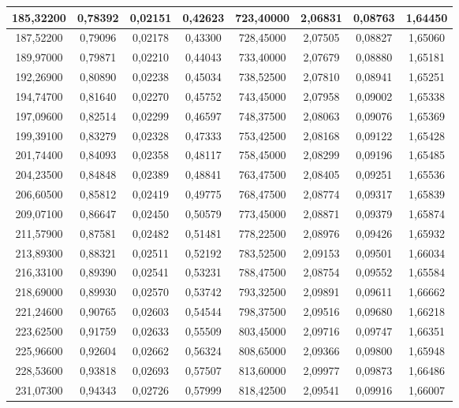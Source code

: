 \documentclass[a4paper,12pt]{article}
\numberwithin{equation}{section}
\begin{document}
\begin{appendices}
\begin{longtable}[c]{|c|c|c|c|c|c|c|c|}
185,32200	&	0,78392	&	0,02151	&	0,42623	&	723,40000	&	2,06831	&	0,08763	&	1,64450	\\\hline
187,52200	&	0,79096	&	0,02178	&	0,43300	&	728,45000	&	2,07505	&	0,08827	&	1,65060	\\\hline
189,97000	&	0,79871	&	0,02210	&	0,44043	&	733,40000	&	2,07679	&	0,08880	&	1,65181	\\\hline
192,26900	&	0,80890	&	0,02238	&	0,45034	&	738,52500	&	2,07810	&	0,08941	&	1,65251	\\\hline
194,74700	&	0,81640	&	0,02270	&	0,45752	&	743,45000	&	2,07958	&	0,09002	&	1,65338	\\\hline
197,09600	&	0,82514	&	0,02299	&	0,46597	&	748,37500	&	2,08063	&	0,09076	&	1,65369	\\\hline
199,39100	&	0,83279	&	0,02328	&	0,47333	&	753,42500	&	2,08168	&	0,09122	&	1,65428	\\\hline
201,74400	&	0,84093	&	0,02358	&	0,48117	&	758,45000	&	2,08299	&	0,09196	&	1,65485	\\\hline
204,23500	&	0,84848	&	0,02389	&	0,48841	&	763,47500	&	2,08405	&	0,09251	&	1,65536	\\\hline
206,60500	&	0,85812	&	0,02419	&	0,49775	&	768,47500	&	2,08774	&	0,09317	&	1,65839	\\\hline
209,07100	&	0,86647	&	0,02450	&	0,50579	&	773,45000	&	2,08871	&	0,09379	&	1,65874	\\\hline
211,57900	&	0,87581	&	0,02482	&	0,51481	&	778,22500	&	2,08976	&	0,09426	&	1,65932	\\\hline
213,89300	&	0,88321	&	0,02511	&	0,52192	&	783,52500	&	2,09153	&	0,09501	&	1,66034	\\\hline
216,33100	&	0,89390	&	0,02541	&	0,53231	&	788,47500	&	2,08754	&	0,09552	&	1,65584	\\\hline
218,69000	&	0,89930	&	0,02570	&	0,53742	&	793,32500	&	2,09891	&	0,09611	&	1,66662	\\\hline
221,24600	&	0,90765	&	0,02603	&	0,54544	&	798,37500	&	2,09516	&	0,09680	&	1,66218	\\\hline
223,62500	&	0,91759	&	0,02633	&	0,55509	&	803,45000	&	2,09716	&	0,09747	&	1,66351	\\\hline
225,96600	&	0,92604	&	0,02662	&	0,56324	&	808,65000	&	2,09366	&	0,09800	&	1,65948	\\\hline
228,53600	&	0,93818	&	0,02693	&	0,57507	&	813,60000	&	2,09977	&	0,09873	&	1,66486	\\\hline
231,07300	&	0,94343	&	0,02726	&	0,57999	&	818,42500	&	2,09541	&	0,09916	&	1,66007	\\\hline

\end{longtable}
\end{appendices}
\end{document}
